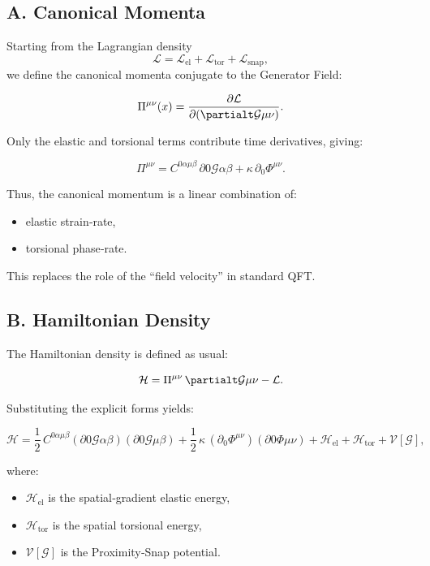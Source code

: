 \documentclass[reprint,amsmath,amssymb,aps,prl,floatfix]{revtex4-2}
\begin{document}
\subsection{A. Canonical Momenta}

Starting from the Lagrangian density  
\[
\mathcal{L}
=
\mathcal{L}_{\mathrm{el}}
+
\mathcal{L}_{\mathrm{tor}}
+
\mathcal{L}_{\mathrm{snap}},
\]
we define the canonical momenta conjugate to the Generator Field:

\[
\Pi^{\mu\nu}(x)
=
\frac{\partial \mathcal{L}}{\partial(\partialt \mathcal{G}{\mu\nu})}.
\]

Only the elastic and torsional terms contribute time derivatives, giving:

\[
\Pi^{\mu\nu}
=
C^{0\alpha\mu\beta}\,\partial0 \mathcal{G}{\alpha\beta}
+
\kappa\,\partial_0 \Phi^{\mu\nu}.
\]

Thus, the canonical momentum is a linear combination of:
\begin{itemize}
\item elastic strain‑rate,  
\item torsional phase‑rate.
\end{itemize}

This replaces the role of the “field velocity” in standard QFT.

\subsection{B. Hamiltonian Density}

The Hamiltonian density is defined as usual:

\[
\mathcal{H}
=
\Pi^{\mu\nu}\,\partialt \mathcal{G}{\mu\nu}
-
\mathcal{L}.
\]

Substituting the explicit forms yields:

\[
\mathcal{H}
=
\frac{1}{2}\,C^{0\alpha\mu\beta}
(\partial0 \mathcal{G}{\alpha\beta})
(\partial0 \mathcal{G}{\mu\beta})
+
\frac{1}{2}\,\kappa\,
(\partial_0 \Phi^{\mu\nu})
(\partial0 \Phi{\mu\nu})
+
\mathcal{H}_{\mathrm{el}}
+
\mathcal{H}_{\mathrm{tor}}
+
\mathcal{V}[\mathcal{G}],
\]

where:
\begin{itemize}
\item \(\mathcal{H}_{\mathrm{el}}\) is the spatial‑gradient elastic energy,  
\item \(\mathcal{H}_{\mathrm{tor}}\) is the spatial torsional energy,  
\item \(\mathcal{V}[\mathcal{G}]\) is the Proximity‑Snap potential.
\end{itemize}
\end{document}
